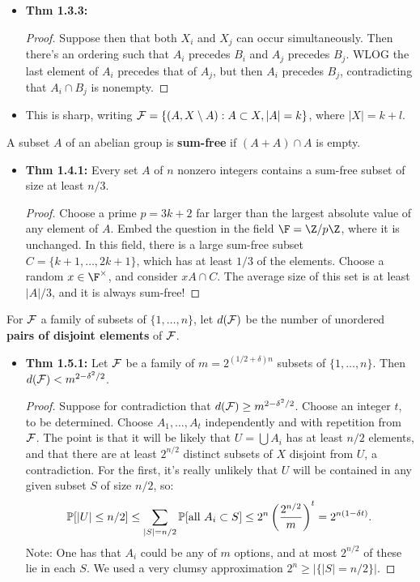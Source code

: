 \documentclass[11pt]{article}
\newenvironment{INT}[1][]{\begin{itemize}\small\item\textbf{#1}}{\end{itemize}}
\begin{document}
\begin{chapter1}
\begin{itemise}
\begin{INT}[Thm 1.3.3:]
\begin{proof}
\INDENT Suppose then that both $X_i$ and $X_j$ can occur simultaneously. Then there's an ordering such that $A_i$ precedes $B_i$ and $A_j$ precedes $B_j$. WLOG the last element of $A_i$ precedes that of $A_j$, but then $A_i$ precedes $B_j$, contradicting that $A_i\cap B_j$ is nonempty.
\end{proof}
\item This is sharp, writing $\mathcal{F}=\{(A,X\setminus A) : A\subset X, |A|=k\}$, where $|X|=k+l$.
\end{INT}
\item A subset $A$ of an abelian group is \textbf{sum-free} if $(A+A)\cap A$ is empty.
\begin{INT}[Thm 1.4.1:]
Every set $A$ of $n$ nonzero integers contains a sum-free subset of size at least $n/3$.
\begin{proof}
Choose a prime $p=3k+2$ far larger than the largest absolute value of any element of $A$. Embed the question in the field $\F=\Z/p\Z$, where it is unchanged. In this field, there is a large sum-free subset $C=\{k+1,\ldots,2k+1\}$, which has at least $1/3$ of the elements. Choose a random $x\in\F^\times$, and consider $xA\cap C$. The average size of this set is at least $|A|/3$, and it is always sum-free!
\end{proof}
\end{INT}
\item For $\mathcal{F}$ a family of subsets of $\{1,\ldots,n\}$, let $d(\mathcal{F})$ be the number of unordered \textbf{pairs of disjoint elements} of $\mathcal{F}$.
\begin{INT}[Thm 1.5.1:]
Let $\mathcal{F}$ be a family of $m=2^{(1/2+\delta)n}$ subsets of $\{1,\ldots,n\}$. Then $d(\mathcal{F})<m^{2-\delta^2/2}$.
\begin{proof}
Suppose for contradiction that $d(\mathcal{F})\geq m^{2-\delta^2/2}$. Choose an integer $t$, to be determined. Choose $A_1,\ldots,A_t$ independently and with repetition from $\mathcal{F}$. The point is that it will be likely that $U=\bigcup A_i$ has at least $n/2$ elements, and that there are at least $2^{n/2}$ distinct subsets of $X$ disjoint from $U$, a contradiction. For the first, it's really unlikely that $U$ will be contained in any given subset $S$ of size $n/2$, so:
\[\operatorname{\mathbb{P}}[|U|\leq n/2]\leq \sum_{|S|=n/2}\operatorname{\mathbb{P}}[\text{all $A_i\subset S$}]\leq 2^n\left(\frac{2^{n/2}}{m}\right)^t=2^{n(1-\delta t)}.\]
Note: One has that $A_i$ could be any of $m$ options, and at most $2^{n/2}$ of these lie in each $S$. We used a very clumsy approximation $2^n\geq |\{|S|=n/2\}|$.


\end{proof}
\end{INT}
\end{itemise}
\end{chapter1}
\end{document}
